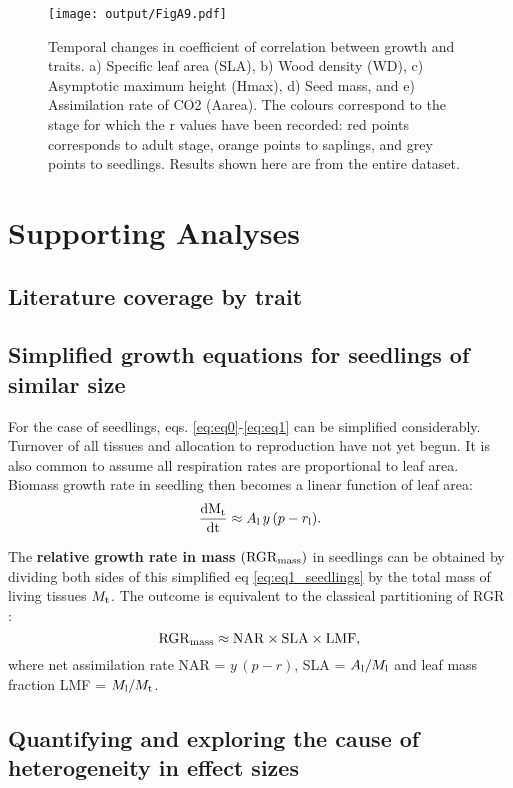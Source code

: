 \documentclass[a4paper,11pt]{article}
\newcommand{\ud}{\ensuremath{\rm{d}}}
\begin{document}
\begin{appendices}
\begin{figure}[h!]
\centering
\texttt{[image: output/FigA9.pdf]}
\caption{Temporal changes in coefficient of correlation between growth and traits. a) Specific leaf area (SLA), b) Wood density (WD), c) Asymptotic maximum height (Hmax), d) Seed mass, and e) Assimilation rate of CO2 (Aarea). The colours correspond to the stage for which the r values have been recorded: red points corresponds to adult stage, orange points to saplings, and grey points to seedlings. Results shown here are from the entire dataset.}
\label{fig:figA9}
\end{figure}

\clearpage
\section{Supporting Analyses}\label{app:supp_info_analyses}

\subsection{Literature coverage by trait}\label{app:literature-snapshot}



\clearpage

\subsection{Simplified growth equations for seedlings of similar size}

For the case of seedlings, eqs. \ref{eq:eq0}-\ref{eq:eq1} can be simplified considerably. Turnover of all tissues and allocation to reproduction have not yet begun. It is also common to assume all respiration rates are proportional to leaf area. Biomass growth rate in seedling then becomes a linear function of leaf area:
\begin{equation}\label{eq:eq1_seedlings}
{\frac{\ud M_{\rm t}}{\ud t}}  \approx  A_{\rm l} \, y \, (p - r_{\rm l}).
\end{equation}

The \textbf{relative growth rate in mass} $({\rm RGR}_{{\rm mass}})$ in seedlings can be obtained by dividing both sides of this simplified eq \ref{eq:eq1_seedlings} by the total mass of living tissues $M_{\rm t}$. The outcome is equivalent to the classical partitioning of RGR \citep{Lambers:1992bj, Cornelissen:1998ta}:
\begin{equation}\label{eq:eq1_seedlings_RGR}
{\rm RGR}_{{\rm mass}}  \approx {\rm NAR} \times  {\rm SLA} \times  {\rm LMF},
\end{equation}
where net assimilation rate NAR = $y \, (p - r)$, SLA = $A_{\rm l}/ M_{\rm l}$ and leaf mass fraction LMF = $M_{\rm l}/ M_{\rm t}$.


\subsection{Quantifying and exploring the cause of heterogeneity in effect sizes}



\end{appendices}
\end{document}
